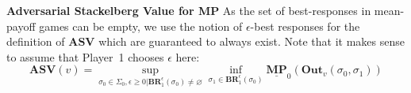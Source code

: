 \noindent\textbf{Adversarial Stackelberg Value for MP} As the set of best-responses in mean-payoff games can be empty, we use the notion of $\epsilon$-best responses for the definition of $\mathbf{ASV}$ which are guaranteed to always exist. Note that it makes sense to assume that Player~1 chooses $\epsilon$ here:
\\





\begin{equation*}
    \mathbf{ASV}(v) = \sup\limits_{\sigma_0 \in \Sigma_0, \epsilon \geqslant 0| \mathbf{BR}^{\epsilon}_1(\sigma_0) \neq \varnothing}  \inf \limits_{\sigma_1 \in \mathbf{BR}^{\epsilon}_1(\sigma_0)} \underline{\mathbf{MP}}_0(\mathbf{Out}_v(\sigma_0,\sigma_1))
\end{equation*}

